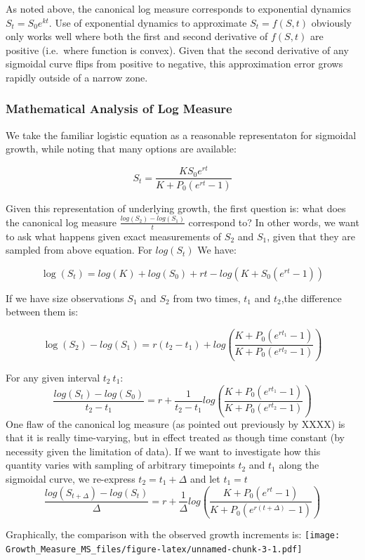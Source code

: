 \documentclass[]{article}
\begin{document}
As noted above, the canonical log measure corresponds to exponential
dynamics \(S_t = S_0e^{kt}\). Use of exponential dynamics to approximate
\(S_t = f(S,t)\) obviously only works well where both the first and
second derivative of \(f(S,t)\) are positive (i.e.~where function is
convex). Given that the second derivative of any sigmoidal curve flips
from positive to negative, this approximation error grows rapidly
outside of a narrow zone.

\subsubsection{Mathematical Analysis of Log
Measure}\label{mathematical-analysis-of-log-measure}

We take the familiar logistic equation as a reasonable representaton for
sigmoidal growth, while noting that many options are available:

\[S_t = \frac{KS_0e^{rt}}{K+P_0(e^{rt}-1)}\]

Given this representation of underlying growth, the first question is:
what does the canonical log measure \(\frac{log(S_2) - log(S_1)}{t}\)
correspond to? In other words, we want to ask what happens given exact
measurements of \(S_2\) and \(S_1\), given that they are sampled from
above equation. For \(log(S_t)\) We have:

\[\log(S_t) = log(K) + log(S_0) + rt - log(K + S_0(e^{rt}-1))\]

If we have size observations \(S_1\) and \(S_2\) from two times, \(t_1\)
and \(t_2\),the difference between them is:

\[\log(S_2) - log(S_1) = r(t_2 - t_1) + log(\frac{K + P_0(e^{rt_1}-1)}{K + P_0(e^{rt_2}-1)})\]

For any given interval \(t_2~t_1\):\\
\[\frac{log(S_t) - log(S_0)}{t_2 - t_1} = r + \frac{1}{t_2-t_1}log(\frac{K + P_0(e^{rt_1}-1)}{K + P_0(e^{rt_2}-1)})\]
One flaw of the canonical log measure (as pointed out previously by
XXXX) is that it is really time-varying, but in effect treated as though
time constant (by necessity given the limitation of data). If we want to
investigate how this quantity varies with sampling of arbitrary
timepoints \(t_2\) and \(t_1\) along the sigmoidal curve, we re-express
\(t_2=t_1+\Delta\) and let \(t_1=t\)
\[\frac{log(S_{t+\Delta}) - log(S_t)}{\Delta} = r + \frac{1}{\Delta}log(\frac{K + P_0(e^{rt}-1)}{K + P_0(e^{r({t+\Delta})}-1)})\]

Graphically, the comparison with the observed growth increments is:
\texttt{[image: Growth\_Measure\_MS\_files/figure-latex/unnamed-chunk-3-1.pdf]}
\end{document}
